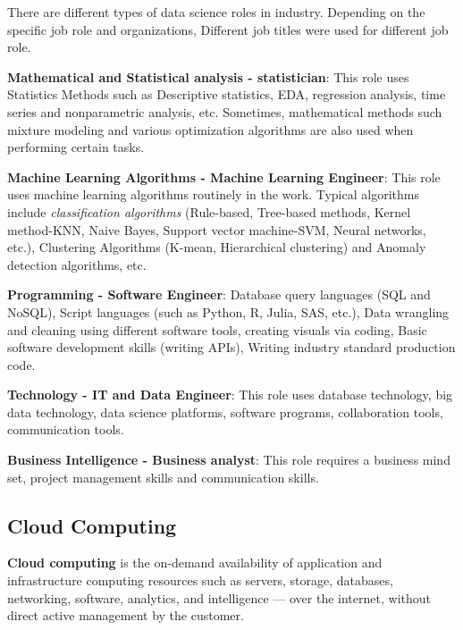 \documentclass[
]{book}
\begin{document}
There are different types of data science roles in industry. Depending on the specific job role and organizations, Different job titles were used for different job role.

\textbf{Mathematical and Statistical analysis - statistician}: This role uses Statistics Methods such as
Descriptive statistics, EDA, regression analysis, time series and nonparametric analysis, etc. Sometimes, mathematical methods such mixture modeling and various optimization algorithms are also used when performing certain tasks.

\textbf{Machine Learning Algorithms - Machine Learning Engineer}: This role uses machine learning algorithms routinely in the work. Typical algorithms include \emph{classification algorithms} (Rule-based, Tree-based methods, Kernel method-KNN, Naive Bayes, Support vector machine-SVM, Neural networks, etc.), Clustering Algorithms (K-mean, Hierarchical clustering) and Anomaly detection algorithms, etc.

\textbf{Programming - Software Engineer}: Database query languages (SQL and NoSQL), Script languages (such as Python, R, Julia, SAS, etc.), Data wrangling and cleaning using different software tools, creating visuals via coding, Basic software development skills (writing APIs), Writing industry standard production code.

\textbf{Technology - IT and Data Engineer}: This role uses database technology, big data technology, data science platforms, software programs, collaboration tools, communication tools.

\textbf{Business Intelligence - Business analyst}: This role requires a business mind set, project management skills and communication skills.

\hypertarget{cloud-computing}{%
\subsection{Cloud Computing}\label{cloud-computing}}

\textbf{Cloud computing} is the on-demand availability of application and infrastructure computing resources such as servers, storage, databases, networking, software, analytics, and intelligence --- over the internet, without direct active management by the customer.
\end{document}
